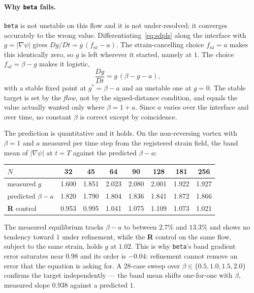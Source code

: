 \documentclass[preprint,3p,11pt]{elsarticle}
\newcommand{\psilev}{\psi}
\newcommand{\gradpsi}{\lvert\nabla\psilev\rvert}
\begin{document}
\paragraph{Why \texttt{beta} fails.}
\label{par:beta}
\texttt{beta} is not unstable on this flow and it is not under-resolved; it
converges accurately to the wrong value. Differentiating~\eqref{eq:sdpls} along
the interface with $g = \gradpsi$ gives $Dg/Dt = g\,(f_{nl} - a)$. The
strain-cancelling choice $f_{nl} = a$ makes this identically zero, so $g$ is
left wherever it started, namely at $1$. The choice $f_{nl} = \beta - g$ makes
it logistic,
\begin{equation}
\frac{Dg}{Dt} = g\,(\beta - g - a),
\label{eq:betalogistic}
\end{equation}
with a stable fixed point at $g^{*} = \beta - a$ and an unstable one at $g=0$.
The stable target is set by the \emph{flow}, not by the signed-distance
condition, and equals the value actually wanted only where $\beta = 1 + a$.
Since $a$ varies over the interface and over time, no constant $\beta$ is
correct except by coincidence.

The prediction is quantitative and it holds. On the non-reversing vortex with
$\beta = 1$ and $a$ measured per time step from the registered strain field,
the band mean of $\gradpsi$ at $t=T$ against the predicted $\beta - a$:
\begin{center}
\begin{tabular}{lccccccc}
\toprule
$N$ & 32 & 45 & 64 & 90 & 128 & 181 & 256 \\
\midrule
measured $g$          & 1.600 & 1.851 & 2.023 & 2.080 & 2.001 & 1.922 & 1.927 \\
predicted $\beta - a$ & 1.820 & 1.790 & 1.804 & 1.836 & 1.841 & 1.872 & 1.866 \\
\addlinespace
\textbf{R} control    & 0.953 & 0.995 & 1.041 & 1.075 & 1.109 & 1.073 & 1.021 \\
\bottomrule
\end{tabular}
\end{center}
The measured equilibrium tracks $\beta - a$ to between $2.7\%$ and $13.3\%$ and
shows no tendency toward $1$ under refinement, while the \textbf{R} control on
the same flow, subject to the same strain, holds $g$ at $1.02$. This is why
\texttt{beta}'s band gradient error saturates near $0.98$ and its order is
$-0.04$: refinement cannot remove an error that the equation is asking for. A
28-case sweep over $\beta \in \{0.5, 1.0, 1.5, 2.0\}$ confirms the target
independently --- the band mean shifts one-for-one with $\beta$, measured slope
$0.938$ against a predicted $1$.
\end{document}
